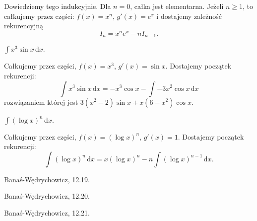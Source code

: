 \begin{solution}
    Dowiedziemy tego indukcyjnie.
    Dla $n = 0$, całka jest elementarna.
    Jeżeli $n \ge 1$, to całkujemy przez części: $f(x) = x^n$, $g'(x) = e^x$ i dostajemy zależność rekurencyjną
    \begin{equation}
        I_n = x^n e^x - nI_{n-1}.
    \end{equation}
\end{solution}

\begin{integral}
    \label{banas_12_14}%
    $\int x^3 \sin x \, \mathrm{d}x$.
\end{integral}

\begin{solution}
    Całkujemy przez części, $f(x) = x^3$, $g'(x) = \sin x$.
    Dostajemy początek rekurencji:
    \begin{equation}
        \int x^3 \sin x \, \mathrm{d}x = - x^3 \cos x - \int - 3x^2 \cos x \,\mathrm{d}x
    \end{equation}
    rozwiązaniem której jest $3 (x^2-2) \sin x + x (6-x^2) \cos x$.
\end{solution}

\begin{integral}
    $\int (\log x)^n \,\mathrm{d}x$.
\end{integral}

\begin{solution}
    Całkujemy przez części, $f(x) = (\log x)^n$, $g'(x) = 1$.
    Dostajemy początek rekurencji:
    \begin{equation}
        \int (\log x)^n \, \mathrm{d}x = x (\log x)^n - n \int (\log x)^{n-1} \,\mathrm{d} x.
    \end{equation}
\end{solution}

\begin{integral}
    Banaś-Wędrychowicz, 12.19. %
\end{integral}

\begin{integral}
Banaś-Wędrychowicz, 12.20. %
\end{integral}

\begin{integral}
Banaś-Wędrychowicz, 12.21. %
\end{integral}

